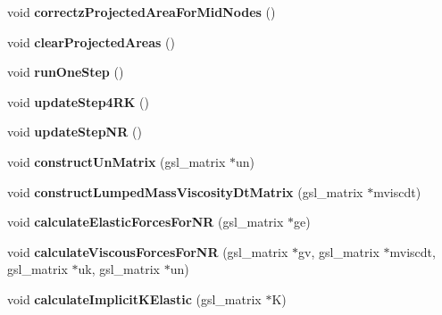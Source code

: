 \begin{DoxyCompactItemize}
\item 
\hypertarget{classSimulation_a7a47dfca0623a5636cb65416411cb901}{}void {\bfseries correctz\+Projected\+Area\+For\+Mid\+Nodes} ()\label{classSimulation_a7a47dfca0623a5636cb65416411cb901}

\item 
\hypertarget{classSimulation_a9c3f5acaa8ec130dedc94dfd6f7b013a}{}void {\bfseries clear\+Projected\+Areas} ()\label{classSimulation_a9c3f5acaa8ec130dedc94dfd6f7b013a}

\item 
\hypertarget{classSimulation_a87606f3d0520a91cc0af6d05428546ab}{}void {\bfseries run\+One\+Step} ()\label{classSimulation_a87606f3d0520a91cc0af6d05428546ab}

\item 
\hypertarget{classSimulation_a716e8eb08d6a6bc37b7d930b21129739}{}void {\bfseries update\+Step4\+R\+K} ()\label{classSimulation_a716e8eb08d6a6bc37b7d930b21129739}

\item 
\hypertarget{classSimulation_a6a869cb433953d1d36249460b0a74545}{}void {\bfseries update\+Step\+N\+R} ()\label{classSimulation_a6a869cb433953d1d36249460b0a74545}

\item 
\hypertarget{classSimulation_ac4afa7d6aa64384e78401aec62dd2270}{}void {\bfseries construct\+Un\+Matrix} (gsl\+\_\+matrix $\ast$un)\label{classSimulation_ac4afa7d6aa64384e78401aec62dd2270}

\item 
\hypertarget{classSimulation_a3a32fcfa18ce4343dface42f0800b35c}{}void {\bfseries construct\+Lumped\+Mass\+Viscosity\+Dt\+Matrix} (gsl\+\_\+matrix $\ast$mviscdt)\label{classSimulation_a3a32fcfa18ce4343dface42f0800b35c}

\item 
\hypertarget{classSimulation_a651bdb7e32e4c9a2db5a84892bba54e8}{}void {\bfseries calculate\+Elastic\+Forces\+For\+N\+R} (gsl\+\_\+matrix $\ast$ge)\label{classSimulation_a651bdb7e32e4c9a2db5a84892bba54e8}

\item 
\hypertarget{classSimulation_a62852dd6f60ee76f3d7ec3c25dfa4a43}{}void {\bfseries calculate\+Viscous\+Forces\+For\+N\+R} (gsl\+\_\+matrix $\ast$gv, gsl\+\_\+matrix $\ast$mviscdt, gsl\+\_\+matrix $\ast$uk, gsl\+\_\+matrix $\ast$un)\label{classSimulation_a62852dd6f60ee76f3d7ec3c25dfa4a43}

\item 
\hypertarget{classSimulation_a37f5c42e6189094eeb354f1290ae9b18}{}void {\bfseries calculate\+Implicit\+K\+Elastic} (gsl\+\_\+matrix $\ast$K)\label{classSimulation_a37f5c42e6189094eeb354f1290ae9b18}


\end{DoxyCompactItemize}
